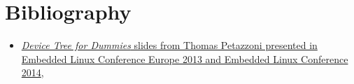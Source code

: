 \chapter*{Bibliography}

\begin{itemize}
  \item \href{https://events.linuxfoundation.org/sites/events/files/slides/petazzoni-device-tree-dummies.pdf}{\textit{Device Tree for Dummies} slides from Thomas Petazzoni presented in Embedded Linux Conference Europe 2013 and Embedded Linux Conference 2014},
\end{itemize}

